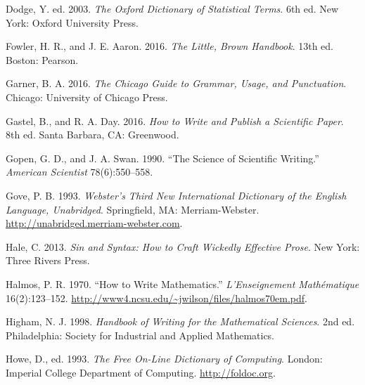 \documentclass{wscpaperproc}
\newcommand{\comment}[1]{}
\theoremstyle{wsc}
\begin{document}
\begin{hangref}
\item
Dodge, Y\@. ed.  2003.  \textit{The Oxford Dictionary of Statistical
Terms}.  6th ed.  New York: Oxford University Press.
  

\item
Fowler, H. R., and J. E. Aaron.  2016.  {\em The Little, Brown Handbook}.
13th ed.  Boston: Pearson.

\comment{
\item
Fowler, H. W\@.  1965.  \textit{A Dictionary of Modern English Usage}.
2nd ed.  Revised and edited by Sir Ernest Gowers. New York: Oxford University Press.
}

\item
Garner, B. A\@.  2016. \textit{The Chicago Guide to Grammar, Usage, and
Punctuation}.  Chicago: University of Chicago Press.

\item
Gastel, B., and R. A. Day. 2016.  {\it How to Write and Publish a
Scientific Paper}.  8th ed.  Santa Barbara, CA: Greenwood.


\item
Gopen, G. D., and J. A. Swan.  1990.  ``The Science of Scientific Writing.''  {\em
American Scientist\/} 78(6):550--558.

\item
Gove, P. B\@.  1993.  {\em Webster's Third New International Dictionary of the English Language,
Unabridged}.  Springfield, MA: Merriam-Webster.  
\href{http://unabridged.merriam-webster.com}{%
\url{http://unabridged.merriam-webster.com}}\textcolor{black}{.}


\item
Hale, C\@.  2013.  \textit{Sin and Syntax: How to Craft Wickedly
Effective Prose}.  New York: Three Rivers Press.

\item
Halmos, P. R\@.  1970. ``How to Write Mathematics.''
\textit{L'Enseignement Math\'ematique} 16(2):123--152. 
\href{http://www4.ncsu.edu/~jwilson/files/halmos70em.pdf}%
{\url{http://www4.ncsu.edu/~jwilson/files/halmos70em.pdf}}\textcolor{black}{.}


\item
Higham, N. J\@.  1998.  {\it Handbook of Writing for the Mathematical
Sciences}.  2nd ed.  Philadelphia: Society for Industrial and Applied
Mathematics.

\item
Howe, D., ed\@.  1993.  \textit{The Free On-Line Dictionary of Computing}.
London: Imperial College Department of Computing.    
\href{http://foldoc.org/}%
{\url{http://foldoc.org}}\textcolor{black}{.}



\end{hangref}
\end{document}
